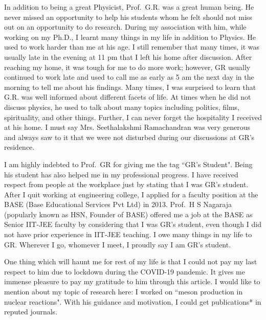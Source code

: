 In addition to being a great Physicist, Prof.\ G.R. was a great human being. He never missed an opportunity to help his students whom he felt should not miss out on an opportunity to do research. During my association with him, while working on my Ph.D., I learnt many things in my life in addition to Physics. He used to work harder than me at his age. I still remember that many times, it was usually late in the evening at 11 pm that I left his home after discussion. After reaching my home, it was tough for me to do more work; however, GR usually continued to work late and used to call me as early as 5 am the next day in the morning to tell me about his findings. Many times, I was surprised to learn that G.R. was well informed about different facets of life. At times when he did not discuss physics, he used to talk about many topics including politics, films, spirituality, and other things. Further, I can never forget the hospitality I received at his home. I must say Mrs. Seethalakshmi Ramachandran was very generous and always saw to it that we were not disturbed during our discussions at GR's residence.

I am highly indebted to Prof.\ GR for giving me the tag ``GR's Student". Being his student has also helped me in my professional progress. I have received respect from people at the workplace just by stating that I was GR's student. After I quit working at engineering college, I applied for a faculty position at the BASE (Base Educational Services Pvt Ltd) in 2013. Prof.\ H S Nagaraja (popularly known as HSN, Founder of BASE) offered me a job at the BASE as Senior IIT-JEE faculty by considering that I was GR's student, even though I did not have prior experience in IIT-JEE teaching. I owe many things in my life to GR. Wherever I go, whomever I meet, I proudly say I am GR's student. 

One thing which will haunt me for rest of my life is that I could not pay my last respect to him due to lockdown during the COVID-19 pandemic. It gives me immense pleasure to pay my gratitude to him through this article. I would like to mention about my topic of research here: I worked on ``meson production in nuclear reactions". With his guidance and motivation, I could get publications* in reputed journals. 
\vskip 1cm


